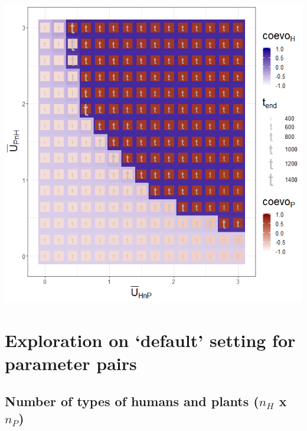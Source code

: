 \documentclass[
]{book}
\begin{document}
\includegraphics[width=1\linewidth]{plots/3_twoPar-mU.HnP-mU.PnH_plot}

\newpage

\hypertarget{exploration-on-default-setting-for-parameter-pairs}{%
\section{Exploration on `default' setting for parameter pairs}\label{exploration-on-default-setting-for-parameter-pairs}}

\hypertarget{number-of-types-of-humans-and-plants-n_h-x-n_p}{%
\subsection{\texorpdfstring{Number of types of humans and plants (\(n_{H}\) x \(n_{P}\))}{Number of types of humans and plants (n\_\{H\} x n\_\{P\})}}\label{number-of-types-of-humans-and-plants-n_h-x-n_p}}

\end{document}
